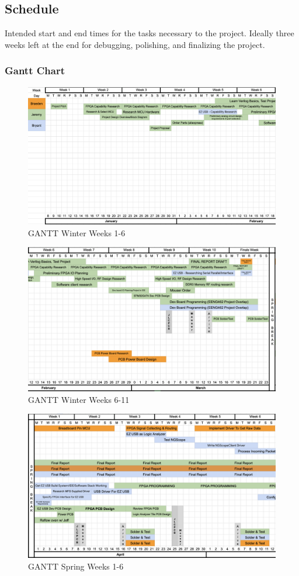 \subsection{Schedule}
	Intended start and end times for the tasks necessary to the project. Ideally three weeks left at the end for debugging, polishing, and finalizing the project.
	\subsubsection{Gantt Chart}
			\begin{figure}[H]
				\centering
				\includegraphics[width=0.8\linewidth]{images/GANTT1.png}
				\caption{GANTT Winter Weeks 1-6}
				\label{fig:ngscope-client}
				\vspace{15px}
			\end{figure}
			\begin{figure}[H]
				\centering
				\includegraphics[width=0.8\linewidth]{images/GANTT2.png}
				\caption{GANTT Winter Weeks 6-11}
				\label{fig:ngscope-client}
				\vspace{15px}
			\end{figure}
			\begin{figure}[H]
				\centering
				\includegraphics[width=0.8\linewidth]{images/GANTT3.png}
				\caption{GANTT Spring Weeks 1-6}
				\label{fig:ngscope-client}
				\vspace{15px}
			\end{figure}
